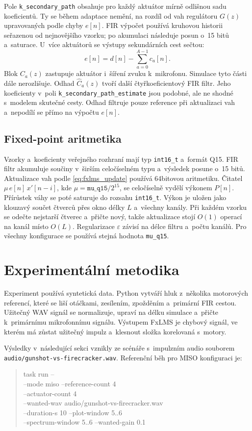 \documentclass[conference]{IEEEtran}
\newcommand{\code}[1]{\texttt{#1}}
\begin{document}
Pole \code{k\_secondary\_path} obsahuje pro každý aktuátor mírně odlišnou sadu koeficientů. Ty se během adaptace nemění, na rozdíl od vah regulátoru $G(z)$ upravovaných podle chyby $e[n]$. FIR výpočet používá kruhovou historii seřazenou od nejnovějšího vzorku; po akumulaci následuje posun o~15 bitů a~saturace. U~více aktuátorů se výstupy sekundárních cest sečtou:
\begin{equation}
  e[n] = d[n] - \sum_{a=0}^{A-1} c_a[n].
\end{equation}
Blok $C_a(z)$ zastupuje aktuátor i~šíření zvuku k~mikrofonu. Simulace tyto části dále nerozlišuje. Odhad $\hat{C}_a(z)$ tvoří další čtyřkoeficientový FIR filtr. Jeho koeficienty v~poli \code{k\_secondary\_path\_estimate} jsou podobné, ale ne shodné s~modelem skutečné cesty. Odhad filtruje pouze reference při aktualizaci vah a~nepodílí se přímo na výpočtu $e[n]$.

\subsection{Fixed-point aritmetika}
Vzorky a~koeficienty veřejného rozhraní mají typ \code{int16\_t} a~formát Q15. FIR filtr akumuluje součiny v~širším celočíselném typu a~výsledek posune o~15 bitů. Aktualizace vah podle \eqref{eq:fxlms_update} používá 64bitovou aritmetiku. Čitatel $\mu\,e[n]\,x'[n-i]$, kde $\mu=\code{mu\_q15}/2^{15}$, se celočíselně vydělí výkonem $P[n]$. Přírůstek váhy se poté saturuje do rozsahu \code{int16\_t}. Výkon je uložen jako klouzavý součet čtverců přes okno délky $L$ a~všechny kanály. Při každém vzorku se odečte nejstarší čtverec a~přičte nový, takže aktualizace stojí $O(1)$ operací na kanál místo $O(L)$. Regularizace $\varepsilon$ závisí na délce filtru a~počtu kanálů. Pro všechny konfigurace se používá stejná hodnota \code{mu\_q15}.

\section{Experimentální metodika}
Experiment používá syntetická data. Python vytváří hluk z~několika motorových referencí, které se liší otáčkami, zesílením, zpožděním a~primární FIR cestou. Užitečný WAV signál se normalizuje, upraví na délku simulace a~přičte k~primárnímu mikrofonnímu signálu. Výstupem FxLMS je chybový signál, ve kterém má zůstat užitečný impulz a~klesnout složka korelovaná s~motory.

Výsledky v~následující sekci vznikly ze scénáře s~impulzním audio souborem \code{audio/gunshot-vs-firecracker.wav}. Referenční běh pro MISO konfiguraci je:
\begin{quote}
\scriptsize\ttfamily
task run --\\
--mode miso --reference-count 4\\
--actuator-count 4\\
--wanted-wav audio/gunshot-vs-firecracker.wav\\
--duration-s 10 --plot-window 5..6\\
--spectrum-window 5..6 --wanted-gain 0.1
\end{quote}
\end{document}
